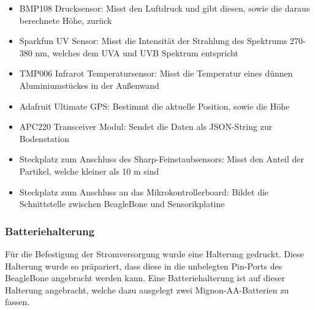 \begin{itemize}
	\item BMP108 Drucksensor: Misst den Luftdruck und gibt diesen, sowie die daraus berechnete Höhe, zurück
	\item Sparkfun UV Sensor: Misst die Intensität der Strahlung des Spektrums 270-380 nm, welches dem UVA und UVB Spektrum entspricht
	\item TMP006 Infrarot Temperatursensor: Misst die Temperatur eines dünnen Aluminiumstückes in der Außenwand 
	\item Adafruit Ultimate GPS: Bestimmt die aktuelle Position, sowie die Höhe
	\item APC220 Transceiver Modul: Sendet die Daten als JSON-String zur Bodenstation
	\item Steckplatz zum Anschluss des Sharp-Feinstaubsensors: Misst den Anteil der Partikel, welche kleiner als 10 \textmu m sind
	\item Steckplatz zum Anschluss an das Mikrokontrollerboard: Bildet die Schnittstelle zwischen BeagleBone und Sensorikplatine
\end{itemize}

\subsubsection{Batteriehalterung}
Für die Befestigung der Stromversorgung wurde eine Halterung gedruckt. Diese Halterung wurde so präpariert, dass diese in die unbelegten Pin-Ports des BeagleBone angebracht werden kann. Eine Batteriehalterung ist auf dieser Halterung angebracht, welche dazu ausgelegt zwei Mignon-AA-Batterien zu fassen.  
